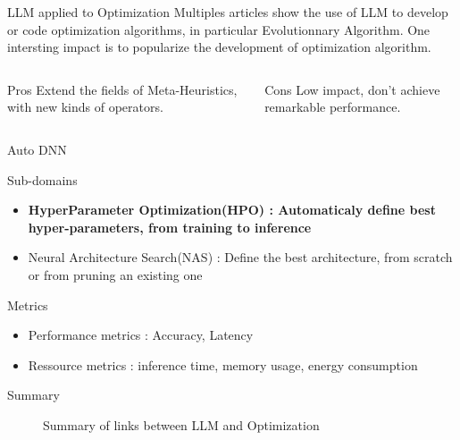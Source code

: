 \begin{frame}{LLM applied to Optimization}
    Multiples articles show the use of LLM to develop or code optimization algorithms, in particular Evolutionnary Algorithm. One intersting impact is to popularize the development of optimization algorithm.

    \begin{columns}
        
        \begin{column}[t]{0.45\textwidth}
            \begin{block}{Pros}
                Extend the fields of Meta-Heuristics, with new kinds of operators. 
                
            \end{block}

        \end{column}

        \begin{column}[t]{0.45\textwidth}
            \begin{block}{Cons}
                Low impact, don't achieve remarkable performance. 
            \end{block}

        \end{column}

    \end{columns}

    
\end{frame}

\begin{frame}{Auto DNN}
    \begin{block}{Sub-domains}
        \begin{itemize}
            \item \textbf{HyperParameter Optimization(HPO) : Automaticaly define best hyper-parameters, from training to inference} 
            \item Neural Architecture Search(NAS) : Define the best architecture, from scratch or from pruning an existing one
        \end{itemize}
        
    \end{block}


    \begin{block}{Metrics}
        \begin{itemize}
            \item Performance metrics : Accuracy, Latency
            \item Ressource metrics : inference time, memory usage, energy consumption
        \end{itemize}
        
    \end{block}
    
\end{frame}

\begin{frame}{Summary}
    \begin{figure}
        
        \caption{Summary of links between LLM and Optimization}
    \end{figure}
    
    
\end{frame}